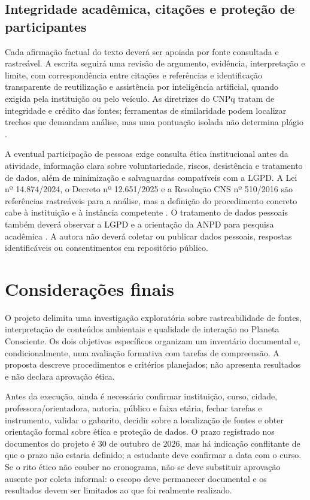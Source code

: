 \documentclass[12pt,oneside,a4paper,brazil]{abntex2}
\begin{document}
\section{Integridade acadêmica, citações e proteção de participantes}
Cada afirmação factual do texto deverá ser apoiada por fonte consultada e rastreável. A escrita seguirá uma revisão de argumento, evidência, interpretação e limite, com correspondência entre citações e referências e identificação transparente de reutilização e assistência por inteligência artificial, quando exigida pela instituição ou pelo veículo. As diretrizes do CNPq tratam de integridade e crédito das fontes; ferramentas de similaridade podem localizar trechos que demandam análise, mas uma pontuação isolada não determina plágio \cite{cnpq}.

A eventual participação de pessoas exige consulta ética institucional antes da atividade, informação clara sobre voluntariedade, riscos, desistência e tratamento de dados, além de minimização e salvaguardas compatíveis com a LGPD. A Lei nº 14.874/2024, o Decreto nº 12.651/2025 e a Resolução CNS nº 510/2016 são referências rastreáveis para a análise, mas a definição do procedimento concreto cabe à instituição e à instância competente \cite{brasil14874,brasil12651,cns510}. O tratamento de dados pessoais também deverá observar a LGPD e a orientação da ANPD para pesquisa acadêmica \cite{lgpd,anpd}. A autora não deverá coletar ou publicar dados pessoais, respostas identificáveis ou consentimentos em repositório público.

\chapter{Considerações finais}
O projeto delimita uma investigação exploratória sobre rastreabilidade de fontes, interpretação de conteúdos ambientais e qualidade de interação no Planeta Consciente. Os dois objetivos específicos organizam um inventário documental e, condicionalmente, uma avaliação formativa com tarefas de compreensão. A proposta descreve procedimentos e critérios planejados; não apresenta resultados e não declara aprovação ética.

Antes da execução, ainda é necessário confirmar instituição, curso, cidade, professora/orientadora, autoria, público e faixa etária, fechar tarefas e instrumento, validar o gabarito, decidir sobre a localização de fontes e obter orientação formal sobre ética e proteção de dados. O prazo registrado nos documentos do projeto é 30 de outubro de 2026, mas há indicação conflitante de que o prazo não estaria definido; a estudante deve confirmar a data com o curso. Se o rito ético não couber no cronograma, não se deve substituir aprovação ausente por coleta informal: o escopo deve permanecer documental e os resultados devem ser limitados ao que foi realmente realizado.
\end{document}
